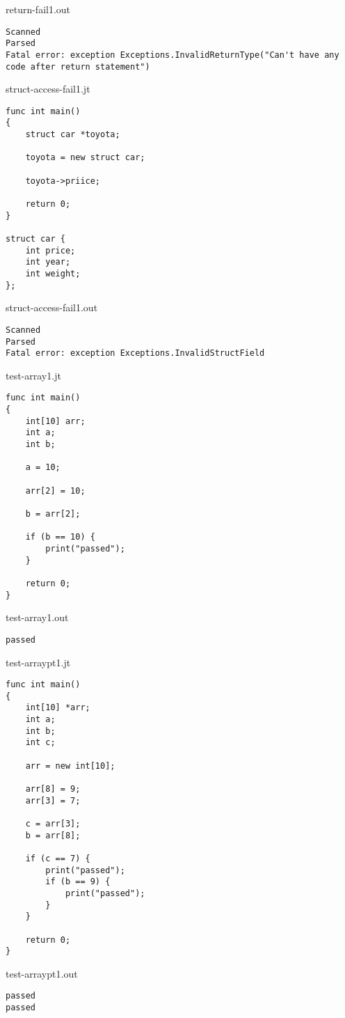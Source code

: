 \documentclass{article}
\begin{document}
return-fail1.out
\begin{lstlisting}
Scanned
Parsed
Fatal error: exception Exceptions.InvalidReturnType("Can't have any code after return statement")
\end{lstlisting}

\newpage


struct-access-fail1.jt
\begin{lstlisting}
func int main()
{
	struct car *toyota;
	
	toyota = new struct car;

	toyota->priice;	

	return 0;
}

struct car {
	int price;
	int year;
	int weight;
};
\end{lstlisting}

struct-access-fail1.out
\begin{lstlisting}
Scanned
Parsed
Fatal error: exception Exceptions.InvalidStructField
\end{lstlisting}

\newpage


test-array1.jt
\begin{lstlisting}
func int main()
{
	int[10] arr;
	int a;
	int b;

	a = 10;
	
	arr[2] = 10;
	
	b = arr[2];

	if (b == 10) {
		print("passed");
	}

	return 0;
}
\end{lstlisting}

test-array1.out
\begin{lstlisting}
passed
\end{lstlisting}

\newpage


test-arraypt1.jt
\begin{lstlisting}
func int main()
{
	int[10] *arr;
	int a;
	int b;
	int c;

	arr = new int[10];

	arr[8] = 9;
	arr[3] = 7;

	c = arr[3];
	b = arr[8];

	if (c == 7) {
		print("passed");
		if (b == 9) {
			print("passed");
		}
	}

	return 0;
}
\end{lstlisting}

test-arraypt1.out
\begin{lstlisting}
passed
passed
\end{lstlisting}
\end{document}
